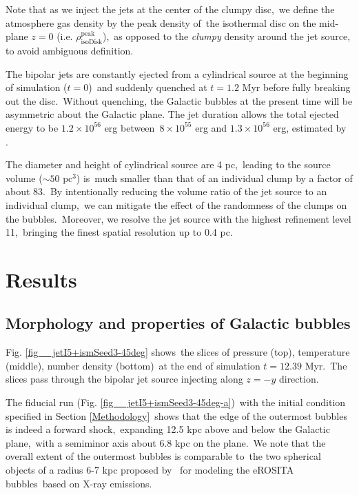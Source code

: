 \documentclass[fleqn,usenatbib,useAMS]{mnras}
\begin{document}
  Note that as we inject the jets at the center of the clumpy disc,\
  we define the atmosphere gas density by the peak density of\
  the isothermal disc on the mid-plane $z=0$ (i.e. $\rho^{\text{peak}}_{\text{isoDisk}}$),\
  as opposed to the \textit{clumpy} density around the jet source, to avoid ambiguous definition.


  The bipolar jets are constantly ejected from a cylindrical source at the beginning of simulation ($t=0$)\
  and suddenly quenched at $t=1.2$ Myr before fully breaking out the disc.\
  Without quenching, the Galactic bubbles at the present time will be asymmetric about the Galactic plane.
  The jet duration allows the total ejected energy to be $1.2\times10^{56}$ erg between\
  $8\times10^{55}$ erg and $1.3\times10^{56}$ erg, estimated by \citet{Predehl2020}.\



  The diameter and height of cylindrical source are 4 pc,\
  leading to the source volume ($\sim 50 \text{ pc}^{3}$) is\
  much smaller than that of an individual clump by a factor of about 83.\
  By intentionally reducing the volume ratio of the jet source to an individual clump,\
  we can mitigate the effect of the randomness of the clumps on the bubbles.\
  Moreover, we resolve the jet source with the highest refinement level 11,\
  bringing the finest spatial resolution up to 0.4 pc.\

\section{Results}
\label{Results}

\subsection{Morphology and properties of Galactic bubbles}

 Fig. \ref{fig__jetI5+ismSeed3-45deg} shows\
 the slices of pressure (top), temperature (middle), number density (bottom)\
 at the end of simulation $t=12.39$ Myr.\
 The slices pass through the bipolar jet source injecting along $z=-y$ direction.

 The fiducial run (Fig. \ref{fig__jetI5+ismSeed3-45deg-a})\
 with the initial condition specified in Section \ref{Methodology}\
 shows that the edge of the outermost bubbles is indeed a forward shock,\
 expanding 12.5 kpc above and below the Galactic plane,\
 with a semiminor axis about 6.8 kpc on the plane.\
 We note that the overall extent of the outermost bubbles is comparable to\
 the two spherical objects of a radius 6-7 kpc proposed by \citet{Predehl2020}\
 for modeling the eROSITA bubbles\
 based on X-ray emissions.
\end{document}
